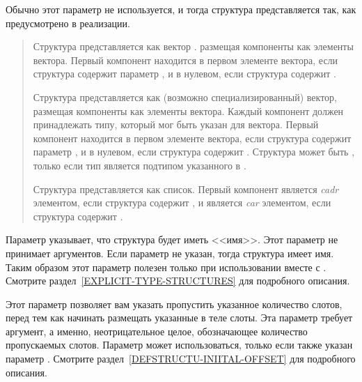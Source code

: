 \begin{flushdesc}
  Обычно этот параметр не используется, и тогда структура представляется так,
  как предусмотрено в реализации.

  \begin{quotation} %
    \begin{flushdesc}

    \item[\cdf{vector}] Структура представляется как вектор . размещая компоненты как элементы вектора. Первый компонент
      находится в первом элементе вектора, если структура содержит параметр
      , и в нулевом, если структура содержит .

    \item[\cd{(vector \emph{element-type})}] Структура представляется как
      (возможно специализированный) вектор, размещая компоненты как элементы
      вектора. Каждый компонент должен принадлежать типу, который мог быть
      указан для вектора. Первый компонент находится в первом элементе вектора,
      если структура содержит параметр , и в нулевом, если структура
      содержит .  Структура может быть , только если тип
       является подтипом указанного в .

    \item[\cdf{list}] Структура представляется как список.  Первый компонент
      является \emph{cadr} элементом, если структура содержит , и
      является \emph{car} элементом, если структура содержит .
    \end{flushdesc}
  \end{quotation}

\item[\cd{:named}] Параметр  указывает, что структура будет иметь
  <<имя>>. Этот параметр не принимает аргументов. Если параметр  не
  указан, тогда структура имеет имя. Таким образом этот параметр полезен только
  при использовании вместе с .  Смотрите
  раздел~\ref{EXPLICIT-TYPE-STRUCTURES} для подробного описания.

\item[\cd{:initial-offset}] Этот параметр позволяет вам указать 
  пропустить указанное количество слотов, перед тем как начинать размещать
  указанные в теле слоты. Эта параметр требует аргумент, а именно,
  неотрицательное целое, обозначающее количество пропускаемых слотов. Параметр
   может использоваться, только если также указан параметр
  .  Смотрите раздел~\ref{DEFSTRUCTU-INIITAL-OFFSET} для подробного
  описания.
\end{flushdesc}

